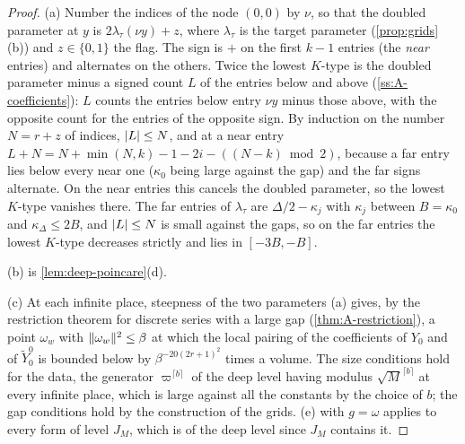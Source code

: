\begin{proof}
(a) Number the indices of the node $(0,0)$ by $\nu$, so that the doubled parameter at $y$ is $2\lambda_\tau(\nu y)+z$, where $\lambda_\tau$ is the target parameter (\cref{prop:grids}(b)) and $z\in\{0,1\}$ the flag. The sign is $+$ on the
first $k-1$ entries (the \emph{near} entries) and alternates on the others. Twice the lowest $K$-type is the doubled parameter minus a signed count $L$ of the entries below and above (\cref{ss:A-coefficients}): $L$ counts the
entries below entry $\nu y$ minus those above, with the opposite count for the entries of the opposite sign. By induction on the number $N=r+z$ of indices, $\lvert L\rvert\le N$, and at a near entry
$L+N=N+\min(N,k)-1-2i-((N-k)\bmod2)$, because a far entry lies below every near one ($\kappa_0$ being large against the gap) and the far signs alternate. On the near entries this cancels the doubled parameter, so the
lowest $K$-type vanishes there. The far entries of $\lambda_\tau$ are $\Delta/2-\kappa_j$ with $\kappa_j$ between $B=\kappa_0$ and $\kappa_\Delta\le2B$, and $\lvert L\rvert\le N$ is small against the gaps, so on the far entries the lowest $K$-type
decreases strictly and lies in $[-3B,-B]$.

(b) is \cref{lem:deep-poincare}(d).

(c) At each infinite place, steepness of the two parameters (a) gives, by the restriction theorem for discrete series with a large gap (\cref{thm:A-restriction}), a point $\omega_w$ with $\lVert \omega_w\rVert^2\le\beta$ at which the local
pairing of the coefficients of $Y_0$ and of $\tilde Y^0_0$ is bounded below by $\beta^{-20(2r+1)^2}$ times a volume. The size conditions hold for the data, the generator $\varpi^{\lceil b\rceil}$ of the deep level having modulus
$\sqrt M^{\lceil b\rceil}$ at every infinite place, which is large against all the constants by the choice of $b$; the gap conditions hold by the construction of the grids. (e) with $g=\omega$ applies to every
form of level $J_M$, which is of the deep level since $J_M$ contains it.
\end{proof}

